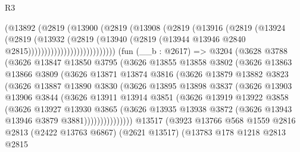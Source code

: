 \begin{lexlean}{R3}
\begin{coremodule}
                            (@13892
                              (@2819
                                (@13900
                                  (@2819
                                    (@13908
                                      (@2819
                                        (@13916
                                          (@2819
                                            (@13924
                                              (@2819
                                                (@13932
                                                  (@2819
                                                    (@13940
                                                      (@2819
                                                        (@13944
                                                          @13946
                                                          @2840
                                                          @2815)))))))))))))))))))))))))))
    (fun (__b : @2617) =>
    @3204
      (@3628
        @3788
        (@3626
          @13847
          @13850
          @3795
          (@3626
            @13855
            @13858
            @3802
            (@3626
              @13863
              @13866
              @3809
              (@3626
                @13871
                @13874
                @3816
                (@3626
                  @13879
                  @13882
                  @3823
                  (@3626
                    @13887
                    @13890
                    @3830
                    (@3626
                      @13895
                      @13898
                      @3837
                      (@3626
                        @13903
                        @13906
                        @3844
                        (@3626
                          @13911
                          @13914
                          @3851
                          (@3626
                            @13919
                            @13922
                            @3858
                            (@3626
                              @13927
                              @13930
                              @3865
                              (@3626
                                @13935
                                @13938
                                @3872
                                (@3626 @13943 @13946 @3879 @3881)))))))))))))))
    @13517
    (@3923
      @13766
      @568
      @1559
      @2816
      @2813
      (@2422 @13763 @6867)
      (@2621 @13517)
      (@13783
        @178
        @1218
        @2813
        @2815

\end{coremodule}
\end{lexlean}
